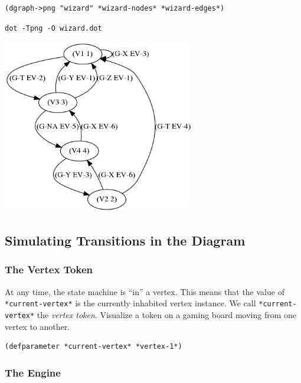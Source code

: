 \documentclass[10pt,oneside,x11names]{article}
\begin{document}
\begin{verbatim}
(dgraph->png "wizard" *wizard-nodes* *wizard-edges*)
\end{verbatim}

\begin{verbatim}
dot -Tpng -O wizard.dot
\end{verbatim}
\begin{center}
\includegraphics[height=3in]{wizard.dot.png}
\end{center}

\subsection{Simulating Transitions in the Diagram}
\label{sec:org5b42445}

\subsubsection{The Vertex Token}
\label{sec:org6ca51de}

At any time, the state machine is ``in'' a vertex. This means that the value
of \texttt{*current-vertex*} is the currently inhabited vertex instance. We call
\texttt{*current-vertex*} the \emph{vertex token}. Visualize a token on a gaming board
moving from one vertex to another.

\begin{verbatim}
(defparameter *current-vertex* *vertex-1*)
\end{verbatim}

\subsubsection{The Engine}
\label{sec:org9dce117}
\end{document}
